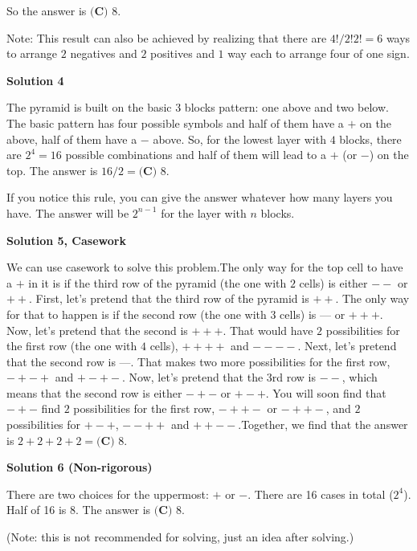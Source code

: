\begin{enumerate}
 So the answer is $\boxed{\textbf{(C) } 8}$.

 Note: This result can also be achieved by realizing that there are $4! / 2! 2! = 6$ ways to arrange $2$ negatives and $2$ positives and $1$ way each to arrange four of one sign.

 



\textbf{Solution 4}

The pyramid is built on the basic 3 blocks pattern: one above and two below. The basic pattern has four possible symbols and half of them have a $+$ on the above, half of them have a $-$ above. So, for the lowest layer with $4$ blocks, there are $2^4=16$ possible combinations and half of them will lead to a $+$ (or $-$) on the top. The answer is $16/2=\boxed{\textbf{(C) } 8}$.

 If you notice this rule, you can give the answer whatever how many layers you have. The answer will be $2^{n-1}$ for the layer with $n$ blocks.

 



\textbf{Solution 5, Casework}

We can use casework to solve this problem.The only way for the top cell to have a $+$ in it is if the third row of the pyramid (the one with $2$ cells) is either $--$ or $++$. First, let's pretend that the third row of the pyramid is $++$. The only way for that to happen is if the second row (the one with $3$ cells) is --- or $+++$. Now, let's pretend that the second is $+++$. That would have $2$ possibilities for the first row (the one with $4$ cells), $++++$ and $----$. Next, let's pretend that the second row is ---. That makes two more possibilities for the first row, $-+-+$ and $+-+-$. Now, let's pretend that the 3rd row is $--$, which means that the second row is either $-+-$ or $+-+$. You will soon find that $-+-$ find $2$ possibilities for the first row, $-++-$ or $-++-$, and $2$ possibilities for $+-+$, $--++$ and $++--$.Together, we find that the answer is $2+2+2+2=\boxed{\textbf{(C) } 8}$.

 



\textbf{Solution 6 (Non-rigorous)}

There are two choices for the uppermost: $+$ or $-$. There are 16 cases in total ($2^4$). Half of 16 is 8. The answer is $\boxed{\textbf{(C) } 8}$.

 (Note: this is not recommended for solving, just an idea after solving.)


\end{enumerate}
